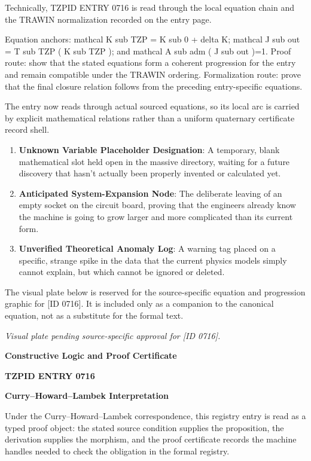Technically, TZPID ENTRY 0716 is read through the local equation chain and the TRAWIN normalization recorded on the entry page.

Equation anchors: mathcal K sub TZP = K sub 0 + delta K; mathcal J sub out = T sub TZP ( K sub TZP ); and mathcal A sub adm ( J sub out )=1. Proof route: show that the stated equations form a coherent progression for the entry and remain compatible under the TRAWIN ordering. Formalization route: prove that the final closure relation follows from the preceding entry-specific equations.

The entry now reads through actual sourced equations, so its local arc is carried by explicit mathematical relations rather than a uniform quaternary certificate record shell.
\endgroup

\begin{enumerate}[leftmargin=1.6em,itemsep=6pt,topsep=4pt]
\item \textbf{Unknown Variable Placeholder Designation}: A temporary, blank mathematical slot held open in the massive directory, waiting for a future discovery that hasn't actually been properly invented or calculated yet.
\item \textbf{Anticipated System-Expansion Node}: The deliberate leaving of an empty socket on the circuit board, proving that the engineers already know the machine is going to grow larger and more complicated than its current form.
\item \textbf{Unverified Theoretical Anomaly Log}: A warning tag placed on a specific, strange spike in the data that the current physics models simply cannot explain, but which cannot be ignored or deleted.
\end{enumerate}

\begingroup\footnotesize\sloppy
The visual plate below is reserved for the source-specific equation and progression graphic for [ID 0716]. It is included only as a companion to the canonical equation, not as a substitute for the formal text.
\par\endgroup
\begingroup\footnotesize\itshape
Visual plate pending source-specific approval for [ID 0716].
\par\endgroup

\clearpage
\begingroup\tzpsupportsetup
\noindent\textbf{\fontsize{10.8pt}{12.8pt}\selectfont [ID 0716] Constructive Logic and Proof Certificate}\par
\noindent\textbf{\fontsize{10pt}{12pt}\selectfont TZPID ENTRY 0716}\par
\vspace{0.45em}
\begingroup
\footnotesize
\setlength{\parskip}{0.22em}
\setlength{\parindent}{0pt}
\noindent\textbf{Curry--Howard--Lambek Interpretation}\par
Under the Curry--Howard--Lambek correspondence, this registry entry is read as a typed proof
object: the stated source condition supplies the proposition, the derivation supplies the
morphism, and the proof certificate records the machine handles needed to check the obligation
in the formal registry.

